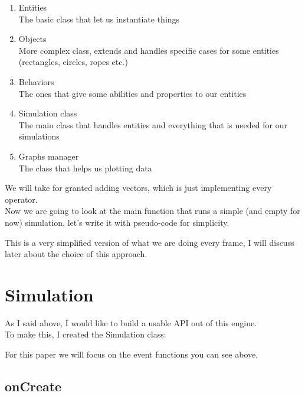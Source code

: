 \documentclass{article}
\begin{document}
    \begin{enumerate}
        \item Entities\\
        The basic class that let us instantiate things
        \item Objects\\
        More complex class, extends and handles specific cases for some entities (rectangles, circles, ropes etc.)
        \item Behaviors\\
        The ones that give some abilities and properties to our entities
        \item Simulation class\\
        The main class that handles entities and everything that is needed for our simulations
        \item Graphs manager\\
        The class that helps us plotting data
    \end{enumerate}

    \newpage

    We will take for granted adding vectors, which is just implementing every operator.\\
    Now we are going to look at the main function that runs a simple (and empty for now) simulation, let's write it with pseudo-code for simplicity.

    

    This is a very simplified version of what we are doing every frame, I will discuss later about the
    choice of this approach.

    \newpage

    \section{Simulation}\label{sec:simulation}

    As I said above, I would like to build a usable API out of this engine.\\
    To make this, I created the Simulation class:

    

    For this paper we will focus on the event functions you can see above.

    \subsection{onCreate}\label{subsec:oncreate}
\end{document}
